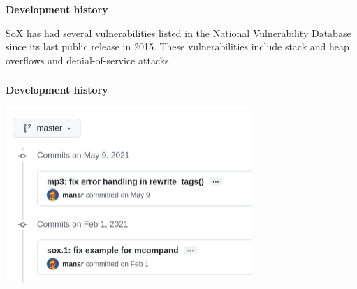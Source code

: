 \documentclass[usenames,dvipsnames, 18pt, compress, aspectratio=169]{beamer}
\begin{document}
\begin{frame}[fragile]{}
    \frametitle{}
    \begin{center}
        \textbf{Development history}
        \vspace{0.2cm}

        \begin{flushleft}
        SoX has had several vulnerabilities listed in the National
        Vulnerability Database since its last public release in 2015. These
        vulnerabilities include stack and heap overflows and denial-of-service
        attacks.
        \end{flushleft}

    \end{center}
\end{frame}

\begin{frame}[fragile]{}
    \frametitle{}
    \begin{center}
        \textbf{Development history}
        \vspace{0.2cm}

        \includegraphics[width=0.7\textwidth]{sox-commits.png}

    \end{center}
\end{frame}
\end{document}
